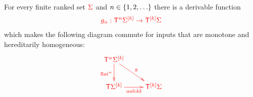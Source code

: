 \begin{lemma}\label{lem:ind-homo-twist}
    For every finite ranked set ${\color{red}{\Sigma}}$ and  $n \in \{1,2,\ldots\}$ there is a derivable function
    \begin{align*}
    {\color{red}{ g_n : {\color{red}{\mathsf T}}^{{\color{red}{n}}} {\color{red}{\Sigma}}^{{\color{red}{[k]}}} \to {\color{red}{\mathsf T}}^{{\color{red}{[k]}}} {\color{red}{\Sigma}}}}
    \end{align*}
    which makes the following diagram commute for inputs that are  monotone and  hereditarily homogeneous: 
    \begin{align*}
        \ranked{
            \xymatrix{
                \tmonadn n \mati k\rSigma \ar[d]_{\flatn n} \ar[rd]^g\\
                \tmonad  \mati k \rSigma \ar[r]_{\unfold}& \mati k \tmonad \rSigma 
            }
        }
    \end{align*}
\end{lemma}
